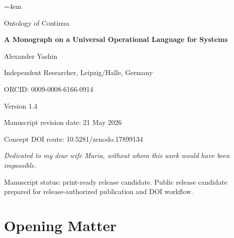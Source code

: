 \documentclass[11pt,a4paper,openany]{book}
\begin{document}
\pagestyle{plain}
\sloppy
\emergencystretch=4em
\hfuzz=80pt

\frontmatter
\begin{titlepage}
\centering
\vspace*{0.08\textheight}
{\Large Ontology of Continua\par}
\vspace{0.35cm}
{\huge\bfseries A Monograph on a Universal Operational Language for Systems\par}
\vspace{0.8cm}
{\large Alexander Yashin\par}
{\normalsize Independent Researcher, Leipzig/Halle, Germany\par}
{\normalsize ORCID: 0009-0008-6166-0914\par}
\vspace{0.45cm}
{\normalsize Version 1.4\par}
{\normalsize Manuscript revision date: 21 May 2026\par}
{\normalsize Concept DOI route: 10.5281/zenodo.17899134\par}
\vfill
\begin{minipage}{0.76\textwidth}
\centering\itshape Dedicated to my dear wife Maria, without whom this work would have been impossible.
\end{minipage}
\vfill
{\small Manuscript status: print-ready release candidate. Public release candidate prepared for release-authorized publication and DOI workflow.\par}
\end{titlepage}
\chapter*{Opening Matter}
\end{document}
